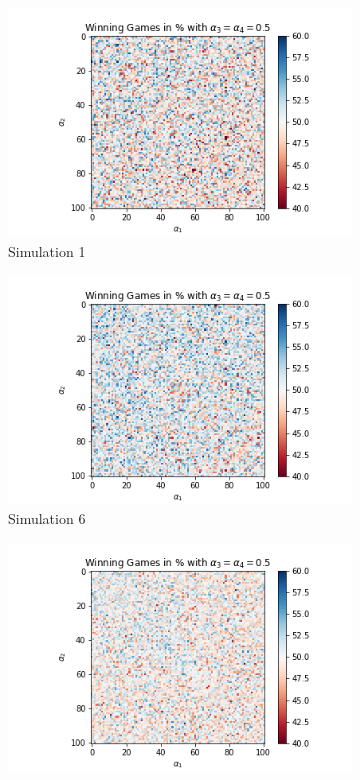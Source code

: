 \begin{figure}[!ht]
	\centering
	\begin{subfigure}{0.3\textwidth}
	    \centering
	    \includegraphics[width=1\linewidth]{Bilder/simulation_2_2}
	    \caption{Simulation 1}
	    \label{fig:meine-grafik}
    \end{subfigure}
	\begin{subfigure}{0.3\textwidth}
	    \centering
	    \includegraphics[width=1\linewidth]{Bilder/simulation_3_2}
	    \caption{Simulation 6}
	    \label{fig:meine-grafik}
    \end{subfigure}
	\begin{subfigure}{0.3\textwidth}
	    \centering
	    \includegraphics[width=1\linewidth]{Bilder/simulation_4_2}

\end{subfigure}
\end{figure}
